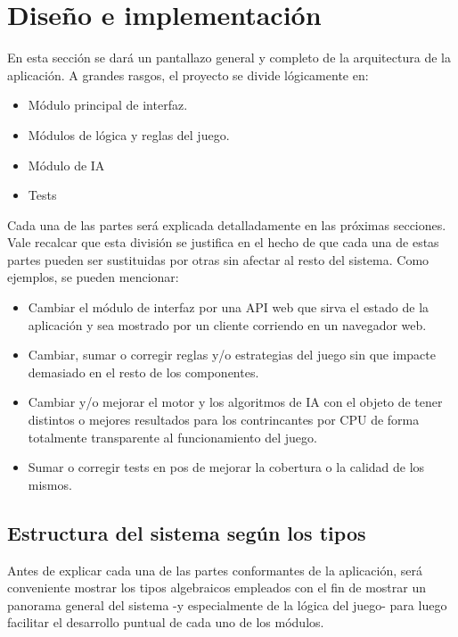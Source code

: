 \documentclass{llncs}
\begin{document}
\section{Diseño e implementación}

En esta sección se dará un pantallazo general y completo de la arquitectura de la aplicación. A grandes rasgos, el proyecto se divide lógicamente en:

\begin{itemize}
  \item Módulo principal de interfaz.
  \item Módulos de lógica y reglas del juego.
  \item Módulo de IA
  \item Tests
\end{itemize}

Cada una de las partes será explicada detalladamente en las próximas secciones. Vale recalcar que esta división se justifica en el hecho de que cada una de estas partes pueden ser sustituidas por otras sin afectar al resto del sistema. Como ejemplos, se pueden mencionar:

\begin{itemize}
  \item Cambiar el módulo de interfaz por una API web que sirva el estado de la aplicación y sea mostrado por un cliente corriendo en un navegador web.
  \item Cambiar, sumar o corregir reglas y/o estrategias del juego sin que impacte demasiado en el resto de los componentes.
  \item Cambiar y/o mejorar el motor y los algoritmos de IA con el objeto de tener distintos o mejores resultados para los contrincantes por CPU de forma totalmente transparente al funcionamiento del juego.
  \item Sumar o corregir tests en pos de mejorar la cobertura o la calidad de los mismos.
\end{itemize}

\subsection{Estructura del sistema según los tipos}

Antes de explicar cada una de las partes conformantes de la aplicación, será conveniente mostrar los tipos algebraicos empleados con el fin de mostrar un panorama general del sistema -y especialmente de la lógica del juego- para luego facilitar el desarrollo puntual de cada uno de los módulos.
\end{document}
